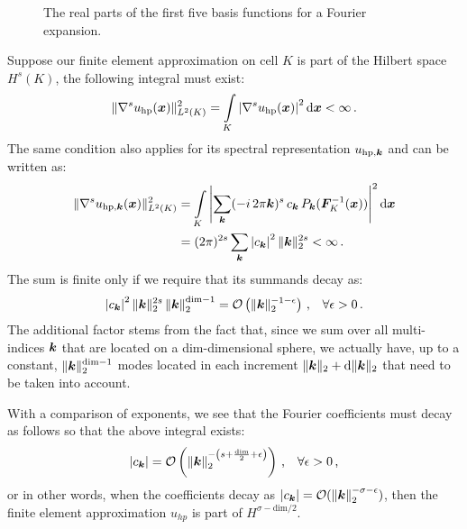 \begin{figure}
\centering

\caption[The first basis functions for a Fourier expansion.]{The real parts of the first five basis functions for a Fourier expansion.}
\label{fig:fourier}
\end{figure}

Suppose our finite element approximation on cell $K$ is part of the Hilbert space $H^s(K)$, the following integral must exist:
\begin{align}
\| \nabla^s u_{\text{hp}}(\vec{x}) \|_{L^2(K)}^2 = \int\limits_K \left| \nabla^s u_{\text{hp}}(\vec{x}) \right|^2 \differential{\vec{x}} < \infty \,\text{.}
\end{align}
The same condition also applies for its spectral representation $u_{\text{hp},\tuple{k}}$ and can be written as:
\begin{align}
\| \nabla^s u_{\text{hp}, \tuple{k}}(\vec{x}) \|_{L^2(K)}^2 &= \int\limits_K \left| \sum\limits_{\tuple{k}} (-i \, 2 \pi \tuple{k})^s \, c_\tuple{k} \, P_\tuple{k}(\mat{F}_K^{-1}(\vec{x})) \right|^2 \differential{\vec{x}} \\
&= (2 \pi)^{2s} \sum\limits_{\tuple{k}} \left| c_\tuple{k} \right|^2 \|\tuple{k}\|_2^{2s} < \infty \,\text{.}
\end{align}
The sum is finite only if we require that its summands decay as:
\begin{align}
\left| c_\tuple{k} \right|^2 \|\tuple{k}\|_2^{2s} \left\| \tuple{k} \right\|_2^{\text{dim} - 1} = \mathcal{O}\left( \|\tuple{k}\|_2^{-1-\epsilon} \right) \,\text{,} \quad \forall \epsilon > 0 \,\text{.}
\end{align}
The additional factor stems from the fact that, since we sum over all multi-indices $\tuple{k}$ that are located on a dim-dimensional sphere, we actually have, up to a constant, $\|\tuple{k}\|_2^{\text{dim}-1}$ modes located in each increment $\|\tuple{k}\|_2 + \differential{\|\tuple{k}\|_2}$ that need to be taken into account. \textcite{dealiistep-27}

With a comparison of exponents, we see that the Fourier coefficients must decay as follows so that the above integral exists:
\begin{align}
|c_\tuple{k}| = \mathcal{O}\left( \left\|\tuple{k}\right\|_2^{-\left(s + \frac{\text{dim}}{2} + \epsilon \right)} \right) \,\text{,} \quad \forall \epsilon > 0 \,\text{,}
\end{align}
or in other words, when the coefficients decay as $\left| c_\tuple{k} \right| = \mathcal{O}( \left\|\tuple{k}\right\|_2^{-\sigma-\epsilon} )$, then the finite element approximation $u_{hp}$ is part of $H^{\sigma - \text{dim}/2}$. \textcite{dealiistep-27}

